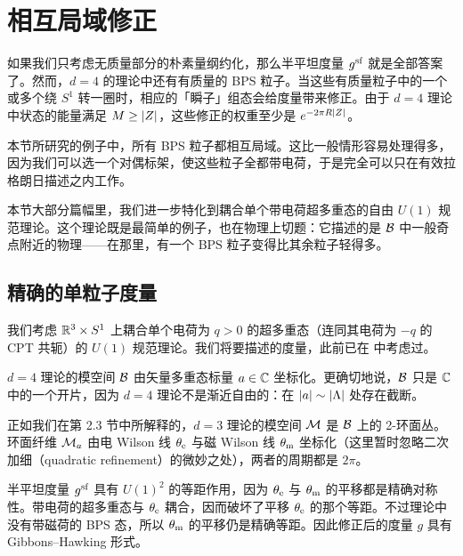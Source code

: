 \providecommand{\plog}[1]{#1\partial_{#1}}
\providecommand{\eps}{\epsilon}

\section{相互局域修正}
\label{sec:periodicnut}

如果我们只考虑无质量部分的朴素量纲约化，那么半平坦度量 $g^{\mathrm{sf}}$ 就是全部答案了。然而，$d=4$ 的理论中还有有质量的 BPS 粒子。当这些有质量粒子中的一个或多个绕 $S^1$ 转一圈时，相应的「瞬子」组态会给度量带来修正。由于 $d=4$ 理论中状态的能量满足 $M \ge \lvert Z \rvert$，这些修正的权重至少是 $e^{-2 \pi R \lvert Z \rvert}$。

本节所研究的例子中，所有 BPS 粒子都相互局域。这比一般情形容易处理得多，因为我们可以选一个对偶标架，使这些粒子全都带电荷，于是完全可以只在有效拉格朗日描述之内工作。

本节大部分篇幅里，我们进一步特化到耦合单个带电荷超多重态的自由 $U(1)$ 规范理论。这个理论既是最简单的例子，也在物理上切题：它描述的是 $\mathcal{B}$ 中一般奇点附近的物理——在那里，有一个 BPS 粒子变得比其余粒子轻得多。

\subsection{精确的单粒子度量}

我们考虑 $\mathbb{R}^3 \times S^1$ 上耦合单个电荷为 $q>0$ 的超多重态（连同其电荷为 $-q$ 的 CPT 共轭）的 $U(1)$ 规范理论。我们将要描述的度量，此前已在 \cite{Ooguri:1996me,Seiberg:1996ns} 中考虑过。

$d=4$ 理论的模空间 $\mathcal{B}$ 由矢量多重态标量 $a \in \mathbb{C}$ 坐标化。更确切地说，$\mathcal{B}$ 只是 $\mathbb{C}$ 中的一个开片，因为 $d=4$ 理论不是渐近自由的：在 $\lvert a \rvert \sim \lvert \Lambda \rvert$ 处存在截断。

正如我们在第 2.3 节中所解释的，$d=3$ 理论的模空间 $\mathcal{M}$ 是 $\mathcal{B}$ 上的 2-环面丛。环面纤维 $\mathcal{M}_a$ 由电 Wilson 线 $\theta_{\mathrm{e}}$ 与磁 Wilson 线 $\theta_{\mathrm{m}}$ 坐标化（这里暂时忽略二次加细（quadratic refinement）的微妙之处），两者的周期都是 $2 \pi$。%

半平坦度量 $g^{\mathrm{sf}}$ 具有 $U(1)^2$ 的等距作用，因为 $\theta_{\mathrm{e}}$ 与 $\theta_{\mathrm{m}}$ 的平移都是精确对称性。带电荷的超多重态与 $\theta_{\mathrm{e}}$ 耦合，因而破坏了平移 $\theta_{\mathrm{e}}$ 的那个等距。不过理论中没有带磁荷的 BPS 态，所以 $\theta_{\mathrm{m}}$ 的平移仍是精确等距。因此修正后的度量 $g$ 具有 Gibbons–Hawking 形式。

